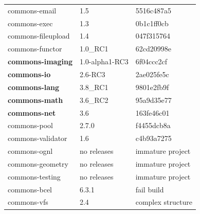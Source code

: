 \documentclass[sigconf,review,anonymous]{acmart}
\begin{document}
\begin{table}[t]
{\begin{tabular}{|l|l|l| }
    commons-email         & 1.5            		& 5516c487a5\\ %
    commons-exec          & 1.3            		& 0b1c1ff0cb\\ %
    commons-fileupload    & 1.4            		& 047f315764\\%
    commons-functor       & 1.0\_RC1       		& 62cd20998e\\ %
    \textbf{commons-imaging}       & 1.0-alpha1-RC3 & 6f04ccc2cf\\ %
    \textbf{commons-io}            & 2.6-RC3        & 2ae025fe5c\\ %
    \textbf{commons-lang}          & 3.8\_RC1   	& 9801e2fb9f\\ %
    \textbf{commons-math}          & 3.6\_RC2   & 95a9d35e77\\ %
    \textbf{commons-net}           & 3.6            	& 163fe46c01\\ %
    commons-pool          & 2.7.0          		& f4455dcb8a\\ %
    commons-validator     & 1.6            		& c4b93a7275\\ %
    \hline
    \hline 
    commons-ognl          & no releases    & immature project \\
    commons-geometry      & no releases    & immature project \\
    commons-testing       & no releases    & immature project \\
    commons-bcel          & 6.3.1           & fail build \\
    commons-vfs           & 2.4             & complex structure \\ %

\end{tabular}}
\end{table}
\end{document}

